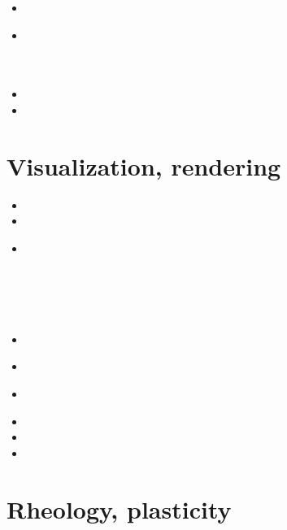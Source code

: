 \begin{scriptsize}
\begin{itemize}
\item[\twothousandsix]
\item[\twothousandthirteen]
 \\
 \\
 \\
\item[\twothousandfourteen]
\item[\twothousandfifteen]
\end{itemize}
\end{scriptsize}

\section{Visualization, rendering}

\begin{scriptsize}
\begin{itemize}
\item[\twothousandfour] 
\item[\twothousandfive] 
\item[\twothousandeight] 
 \\
 \\
 \\
 \\
 \\
\item[\twothousandtwelve] 
 \\
\item[\twothousandfifteen] 
\item[\twothousandseventeen] 
 \\
\item[\twothousandeighteen] 
\item[\twothousandnineteen] 
\item[\twothousandtwenty] 
\end{itemize}
\end{scriptsize}

\section{Rheology, plasticity}

\


